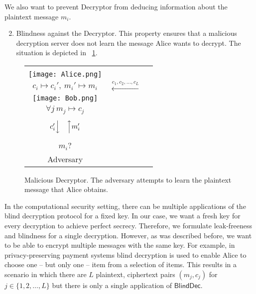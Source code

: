 \documentclass[10pt,journal]{IEEEtran}
\newcommand{\sch}[1]{\mathsf{#1}}
\begin{document}
We also want to prevent Decryptor from deducing information about the plaintext message $m_i$.
\begin{enumerate}
\setcounter{enumi}{1}
	\item Blindness against the Decryptor. This property ensures that a malicious decryption server does not learn the message Alice wants to decrypt. The situation
is depicted in \figurename~\ref{fig:malicious_server}.
\end{enumerate}
\begin{figure}[!t]
\centering
\begin{tabular}{ccc}
\ovalbox{\begin{minipage}{0.3\columnwidth}
\centering
Alice\\
\vspace{0.1cm}
\texttt{[image: Alice.png]}\\
$c_i \mapsto c_i', ~ m_i' \mapsto m_i$
\end{minipage}
}
& $\overset{c_1,c_2,\ldots,c_L}{\longleftarrow}$ & 
\ovalbox{\begin{minipage}{0.3\columnwidth}
\centering
Encryptor\\
\vspace{0.1cm}
\texttt{[image: Bob.png]}\\
$\forall j~m_j \mapsto c_j$
\end{minipage}
}\\
 & & \\
$c_i' \Big\downarrow \quad \Big\uparrow m_i'$ & & \\
 & & \\
\color{red}
\Ovalbox{\begin{minipage}{0.3\columnwidth}
\centering
$c_i' \mapsto m_i'$\\
$m_i?$\\
Adversary
\end{minipage}
}
\end{tabular}
\caption{Malicious Decryptor. The adversary attempts to learn the plaintext message that Alice obtains.}
\label{fig:malicious_server}
\end{figure}
In the computational security setting, there can be multiple applications of the blind decryption
protocol for a fixed key.
In our case, we want a fresh key for every decryption to achieve perfect secrecy.
Therefore, we formulate leak-freeness and blindness for a single decryption.
However, as was described before, we want to be able to encrypt multiple messages with the same key.
For example, in privacy-preserving payment
systems blind decryption is used to enable Alice to choose one -- but only one -- item from a selection of items.
This results in
a scenario in which there are $L$ plaintext, ciphertext pairs $(m_j,c_j)$ for $j \in \{1,2,\ldots,L\}$
but there is only a single application of $\sch{BlindDec}$.
\end{document}
